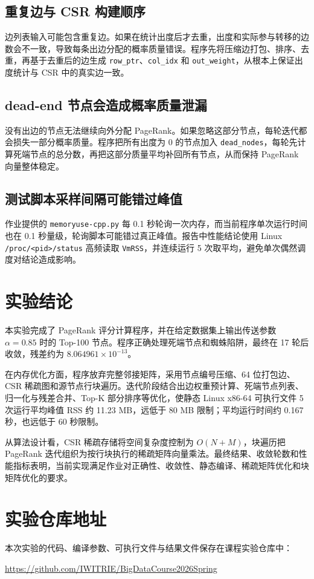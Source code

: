 \documentclass[UTF8,a4paper,10pt]{ctexart}
\newcommand{\xiaosi}{\fontsize{12pt}{20pt}\selectfont}
\begin{document}
\subsection{重复边与 CSR 构建顺序}

边列表输入可能包含重复边。如果在统计出度后才去重，出度和实际参与转移的边数会不一致，导致每条出边分配的概率质量错误。程序先将压缩边打包、排序、去重，再基于去重后的边生成 \texttt{row\_ptr}、\texttt{col\_idx} 和 \texttt{out\_weight}，从根本上保证出度统计与 CSR 中的真实边一致。

\subsection{dead-end 节点会造成概率质量泄漏}

没有出边的节点无法继续向外分配 PageRank。如果忽略这部分节点，每轮迭代都会损失一部分概率质量。程序把所有出度为 0 的节点加入 \texttt{dead\_nodes}，每轮先计算死端节点的总分数，再把这部分质量平均补回所有节点，从而保持 PageRank 向量整体稳定。

\subsection{测试脚本采样间隔可能错过峰值}

作业提供的 \texttt{memoryuse-cpp.py} 每 0.1 秒轮询一次内存，而当前程序单次运行时间也在 0.1 秒量级，轮询脚本可能错过真正峰值。报告中性能结论使用 Linux \texttt{/proc/<pid>/status} 高频读取 \texttt{VmRSS}，并连续运行 5 次取平均，避免单次偶然调度对结论造成影响。

\section{实验结论}
\xiaosi

本实验完成了 PageRank 评分计算程序，并在给定数据集上输出传送参数 $\alpha=0.85$ 时的 Top-100 节点。程序正确处理死端节点和蜘蛛陷阱，最终在 17 轮后收敛，残差约为 $8.064961\times10^{-13}$。

在内存优化方面，程序放弃完整邻接矩阵，采用节点编号压缩、64 位打包边、CSR 稀疏图和源节点行块遍历。迭代阶段结合出边权重预计算、死端节点列表、归一化与残差合并、Top-K 部分排序等优化，使静态 Linux x86-64 可执行文件 5 次运行平均峰值 RSS 约 11.23 MB，远低于 80 MB 限制；平均运行时间约 0.167 秒，也远低于 60 秒限制。

从算法设计看，CSR 稀疏存储将空间复杂度控制为 $O(N+M)$，块遍历把 PageRank 迭代组织为按行块执行的稀疏矩阵向量乘法。最终结果、收敛轮数和性能指标表明，当前实现满足作业对正确性、收敛性、静态编译、稀疏矩阵优化和块矩阵优化的要求。

\section{实验仓库地址}
\xiaosi

本次实验的代码、编译参数、可执行文件与结果文件保存在课程实验仓库中：

\url{https://github.com/IWITRIE/BigDataCourse2026Spring}
\end{document}
